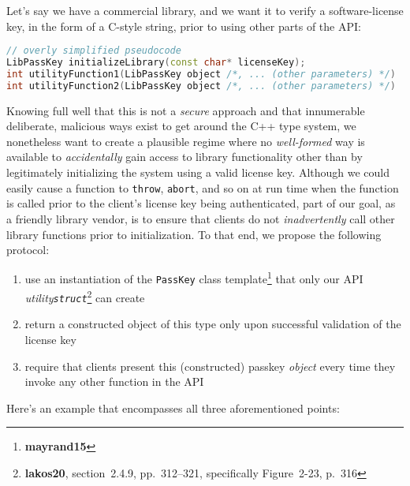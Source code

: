 Let's say we have a commercial library, and we want it to verify a
software-license key, in the form of a C-style string, prior to using
other parts of the API:

\begin{lstlisting}[language=C++]
// overly simplified pseudocode
LibPassKey initializeLibrary(const char* licenseKey);
int utilityFunction1(LibPassKey object /*, ... (other parameters) */)
int utilityFunction2(LibPassKey object /*, ... (other parameters) */)
\end{lstlisting}

\noindent Knowing full well that this is not a \emph{secure} approach and that
innumerable deliberate, malicious ways exist to get around the C++ type
system, we nonetheless want to create a plausible regime where no
\emph{well-formed} way is available to \emph{accidentally} gain access
to library functionality other than by legitimately initializing the
system using a valid license key. Although we could easily cause a
function to \texttt{throw}, \texttt{abort}, and so on at run time when
the function is called prior to the client's license key being
authenticated, part of our goal, as a friendly library vendor, is to
ensure that clients do not \emph{inadvertently} call other library
functions prior to initialization. To that end, we propose the following protocol:
\begin{enumerate}
\item{use an instantiation of the \texttt{PassKey} class template\cprotect\footnote{\textbf{mayrand15}} that only our API \emph{utility}\linebreak[4] \emph{\texttt{struct}}\cprotect\footnote{\textbf{lakos20}, section~2.4.9, pp.~312--321, specifically Figure~2-23, p.~316} can create}
\item{return a constructed object of this type only upon successful validation of the license key}
\item{require that clients present this (constructed) passkey \emph{object} every time they invoke any other function in the API}
\end{enumerate}
Here's an example that encompasses all three aforementioned points:

